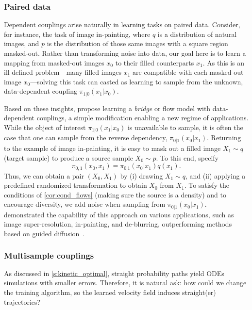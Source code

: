 \documentclass{fairmeta}
\numberwithin{equation}{section}
\begin{document}
\subsubsection{Paired data}

Dependent couplings arise naturally in learning tasks on paired data.
Consider, for instance, the task of image in-painting, where $q$ is a distribution of natural images, and $p$ is the distribution of those same images with a square region masked-out. 
Rather than transforming noise into data, our goal here is to learn a mapping from masked-out images $x_0$ to their filled counterparts $x_1$.
As this is an ill-defined problem---many filled images $x_1$ are compatible with each masked-out image $x_0$---solving this task can casted as learning to sample from the unknown, data-dependent coupling $\pi_{1|0}(x_1|x_0)$.

Based on these insights, \citet{liu2023i2sb,albergo2024datadependent} propose learning a \emph{bridge} or flow model with data-dependent couplings, a simple modification enabling a new regime of applications.
While the object of interest $\pi_{1|0}(x_1|x_0)$ is unavailable to sample, it is often the case that one can sample from the reverse dependency, $\pi_{0|1}(x_0|x_1)$.
Returning to the example of image in-painting, it is easy to mask out a filled image $X_1 \sim q$ (target sample) to produce a source sample $X_0 \sim p$.
To this end, specify
\begin{equation}
    \pi_{0,1}(x_0,x_1)=\pi_{0|1}(x_0|x_1)q(x_1).\label{e:data_dependent_couplings}
\end{equation}
Thus, we can obtain a pair $(X_0, X_1)$ by (i) drawing $X_1 \sim q$, and (ii) applying a predefined randomized transformation to obtain $X_0$ from $X_1$.
To satisfy the conditions of \cref{cor:cond_flows} (making sure the source is a density) and to     encourage diversity, we add noise when sampling from $\pi_{0|1}(x_0|x_1)$.
\citep{liu2023i2sb,albergo2024datadependent} demonstrated the capability of this approach on various applications, such as image super-resolution, in-painting, and de-blurring, outperforming methods based on guided diffusion~\citep{saharia2022palette}.


\subsubsection{Multisample couplings}

As discussed in \cref{s:kinetic_optimal}, straight probability paths yield ODEs simulations with smaller errors.
Therefore, it is natural ask: how could we change the training algorithm, so the learned velocity field induces straight(er)  trajectories?
\end{document}
